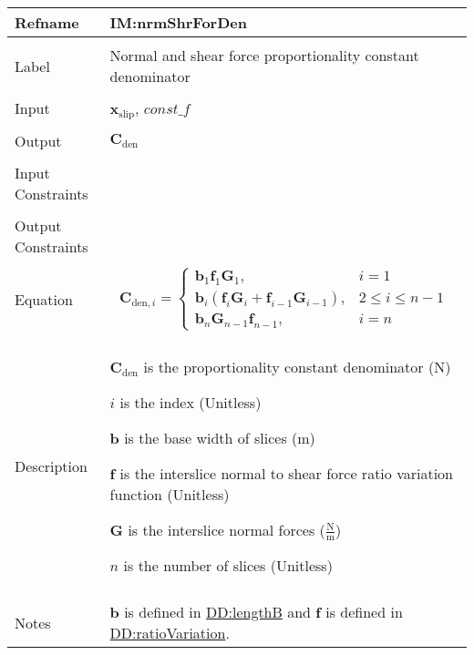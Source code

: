 \documentclass[12pt]{article}
\begin{document}
\vspace{\baselineskip}
\noindent
\begin{minipage}{\textwidth}
\begin{tabular}{>{\raggedright}p{}>{\raggedright\arraybackslash}p{}}
\toprule \textbf{Refname} & \textbf{IM:nrmShrForDen}
\label{IM:nrmShrForDen}
\\ \midrule \\
Label & Normal and shear force proportionality constant denominator
        
\\ \midrule \\
Input & ${\symbf{x}_{\text{slip}}}$, $\mathit{const\_f}$
        
\\ \midrule \\
Output & ${\symbf{C}_{\text{den}}}$
         
\\ \midrule \\
Input Constraints & 
\\ \midrule \\
Output Constraints & 
\\ \midrule \\
Equation & \begin{displaymath}
           {\symbf{C}_{\text{den},i}}=\begin{cases}
                                      {\symbf{b}}_{1} {\symbf{f}}_{1} {\symbf{G}}_{1}, & i=1\\
                                      {\symbf{b}}_{i} \left({\symbf{f}}_{i} {\symbf{G}}_{i}+{\symbf{f}}_{i-1} {\symbf{G}}_{i-1}\right), & 2\leq{}i\leq{}n-1\\
                                      {\symbf{b}}_{n} {\symbf{G}}_{n-1} {\symbf{f}}_{n-1}, & i=n
                                      \end{cases}
           \end{displaymath}
\\ \midrule \\
Description & \begin{symbDescription}
              \item{${\symbf{C}_{\text{den}}}$ is the proportionality constant denominator (${\text{N}}$)}
              \item{$i$ is the index (Unitless)}
              \item{$\symbf{b}$ is the base width of slices (${\text{m}}$)}
              \item{$\symbf{f}$ is the interslice normal to shear force ratio variation function (Unitless)}
              \item{$\symbf{G}$ is the interslice normal forces ($\frac{\text{N}}{\text{m}}$)}
              \item{$n$ is the number of slices (Unitless)}
              \end{symbDescription}
\\ \midrule \\
Notes & $\symbf{b}$ is defined in \hyperref[DD:lengthB]{DD:lengthB} and $\symbf{f}$ is defined in \hyperref[DD:ratioVariation]{DD:ratioVariation}.
        

\end{tabular}
\end{minipage}
\end{document}
